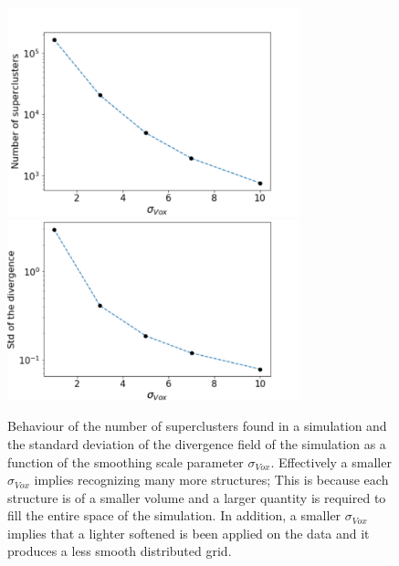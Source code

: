 \documentclass[usenatbib]{mnras}
\begin{document}
\begin{figure}
    \centering
    \includegraphics[width=240pt]{num_superclusters.pdf}
    \includegraphics[width=240pt]{std_smooth.pdf}
    \caption{Behaviour of the number of superclusters found in a
      simulation and the standard deviation of the divergence field of
      the simulation as a function of the smoothing scale parameter
      $\sigma_{Vox}$. Effectively a smaller $\sigma_{Vox}$ implies
      recognizing many more structures; This is because each structure
      is of a smaller volume and a larger quantity is required to fill
      the entire space of the simulation. In addition, a smaller
      $\sigma_{Vox}$ implies that a lighter softened is been applied
      on the data and it produces a less smooth distributed grid.} 
    \label{fig:Nclusters}
\end{figure}
\end{document}
